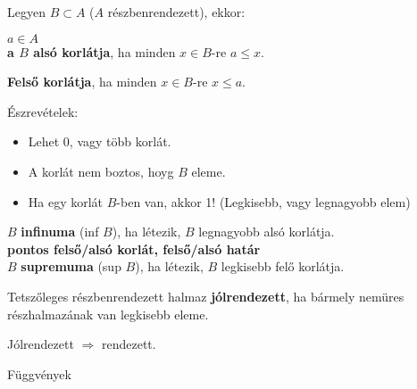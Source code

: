 \documentclass{beamer}
\newcommand{\msmallskip}{\vspace{0.3em}}
\newcommand{\mmedskip}{\vspace{0.5em}}
\begin{document}
\begin{frame}
\begin{tcolorbox}[title={Def.: Alsó korlát, Felső korlát}]
Legyen $B \subset A$ ($A$ részbenrendezett), ekkor:\\
\msmallskip

$a \in A$\\
\textbf{a $B$ alsó korlátja}, ha minden $x \in B$-re $a \leq x$.\\
\mmedskip

\textbf{Felső korlátja}, ha minden $x \in B$-re $x \leq a$.\\
\mmedskip

Észrevételek:\\
\begin{itemize}
\item Lehet 0, vagy több korlát.
\item A korlát nem boztos, hoyg $B$ eleme.
\item Ha egy korlát $B$-ben van, akkor 1! (Legkisebb, vagy legnagyobb elem)
\end{itemize}
\end{tcolorbox}

\begin{tcolorbox}[title={Def.: Infinum, Supremum}]
$B$ \textbf{infinuma} (inf $B$), ha létezik, $B$ legnagyobb alsó korlátja.\\
\textbf{pontos felső/alsó korlát, felső/alsó határ}\\
$B$ \textbf{supremuma} (sup $B$), ha létezik, $B$ legkisebb felő korlátja.
\end{tcolorbox}

\begin{tcolorbox}[title={Def.: Jólrendezett halmaz}]
Tetszőleges részbenrendezett halmaz \textbf{jólrendezett}, ha bármely nemüres részhalmazának van legkisebb eleme.
\end{tcolorbox}

\begin{tcolorbox}[title={Ész}]
Jólrendezett $\Rightarrow$ rendezett.
\end{tcolorbox}
\end{frame}


\begin{frame}[plain]
\begin{tcolorbox}[center, colback={myyellow}, coltext={black}, colframe={myyellow}]
    {\Huge Függvények}
    \mmedskip
\end{tcolorbox}
\end{frame}
\end{document}
